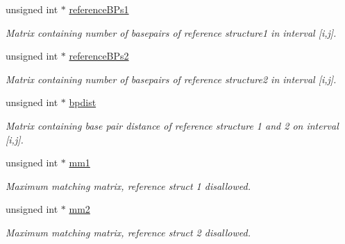 \begin{Indent}
\begin{DoxyCompactItemize}
unsigned int $\ast$ \mbox{\hyperlink{group__fold__compound_a62a8d4ab8dadffbf09da917adff6c71e}{reference\+B\+Ps1}}
\begin{DoxyCompactList}\small\item\em Matrix containing number of basepairs of reference structure1 in interval \mbox{[}i,j\mbox{]}. \end{DoxyCompactList}\item 
\mbox{\label{group__fold__compound_a19187f33433e84683730dedff8544f71}} 
unsigned int $\ast$ \mbox{\hyperlink{group__fold__compound_a19187f33433e84683730dedff8544f71}{reference\+B\+Ps2}}
\begin{DoxyCompactList}\small\item\em Matrix containing number of basepairs of reference structure2 in interval \mbox{[}i,j\mbox{]}. \end{DoxyCompactList}\item 
\mbox{\label{group__fold__compound_a5c53e55583ce096148075bc240fc2bce}} 
unsigned int $\ast$ \mbox{\hyperlink{group__fold__compound_a5c53e55583ce096148075bc240fc2bce}{bpdist}}
\begin{DoxyCompactList}\small\item\em Matrix containing base pair distance of reference structure 1 and 2 on interval \mbox{[}i,j\mbox{]}. \end{DoxyCompactList}\item 
\mbox{\label{group__fold__compound_a0af5a888bac2ae32107da32776144504}} 
unsigned int $\ast$ \mbox{\hyperlink{group__fold__compound_a0af5a888bac2ae32107da32776144504}{mm1}}
\begin{DoxyCompactList}\small\item\em Maximum matching matrix, reference struct 1 disallowed. \end{DoxyCompactList}\item 
\mbox{\label{group__fold__compound_a54c0b979274b285a7e093ed54aa3252e}} 
unsigned int $\ast$ \mbox{\hyperlink{group__fold__compound_a54c0b979274b285a7e093ed54aa3252e}{mm2}}
\begin{DoxyCompactList}\small\item\em Maximum matching matrix, reference struct 2 disallowed. \end{DoxyCompactList}\end{DoxyCompactItemize}
\end{Indent}
